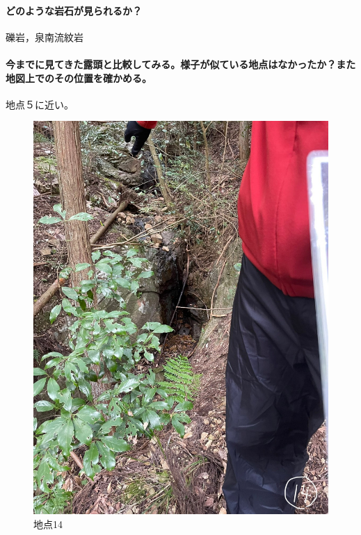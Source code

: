 \documentclass[uplatex,b5paper]{jsreport}
\begin{document}
      \paragraph{どのような岩石が見られるか？}
      礫岩，泉南流紋岩
      \paragraph{今までに見てきた露頭と比較してみる。様子が似ている地点はなかったか？また地図上でのその位置を確かめる。}
      地点５に近い。
  \begin{figure}[h]
    \begin{center}
      \includegraphics[scale=0.15]{files/地学実習/地点14.jpg}
      \caption{地点14}
    \end{center}    
  \end{figure}
  \clearpage
\end{document}
